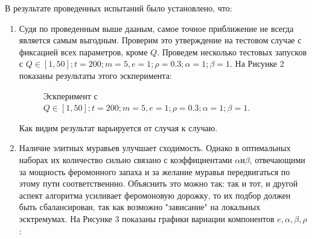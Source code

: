 \documentclass[a4paper, 12pt]{article}
\begin{document}
	\clearpage
	\newpage
	В результате проведенных испытаний было установлено, что:\\
	\begin{enumerate}
		\item Судя по проведенным выше дааным, самое точное приближение не всегда является самым выгодным. Проверим это утверждение на тестовом случае с фиксацией всех параметров, кроме $Q$. Проведем несколько тестовых запусков с $Q \in [1, 50]; t = 200; m = 5, e = 1; \rho = 0.3; \alpha = 1; \beta = 1.$ На Рисунке 2 показаны результаты этого эскперимента:\\
		\begin{figure}[h!]
			\caption{Эскперимент с $Q \in [1, 50]; t = 200; m = 5, e = 1; \rho = 0.3; \alpha = 1; \beta = 1.$}
		\end{figure}
		Как видим результат варьируется от случая к случаю.
		\item Наличие элитных муравьев улучшает сходимость. Однако в оптимальных наборах их количество сильно связано с коэффициентами $\alpha и \beta$, отвечающими за мощность феромонного запаха и за желание муравья передвигаться по этому пути соответственнно. Объяснить это можно так: так и тот, и другой аспект алгоритма усиливает феромоновую дорожку, то их подбор должен быть сбалансирован, так как возможно "зависание" на локальных эсктремумах. На Рисунке 3 показаны графики вариации компонентов $e, \alpha, \beta, \rho$:
		\clearpage
		\newpage
		\begin{figure}[h]

\end{figure}
\end{enumerate}
\end{document}

